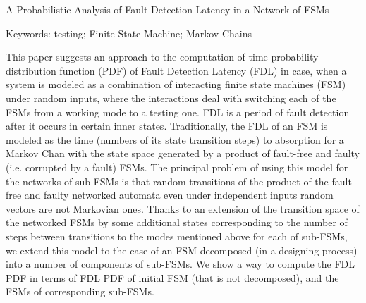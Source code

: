                 A Probabilistic Analysis of Fault Detection Latency in a Network of FSMs

Keywords: testing; Finite State Machine; Markov Chains 

    This paper suggests an approach to the computation of time probability distribution 
function (PDF) of Fault Detection Latency (FDL) in case, when a system is modeled as a 
combination of interacting finite state machines (FSM) under random inputs, where the 
interactions deal with switching each of the FSMs from a working mode to a testing one. FDL is 
a period of fault detection after it occurs in certain inner states. Traditionally, the FDL of an 
FSM is modeled as the time (numbers of its state transition steps) to absorption for a Markov 
Chan with the state space generated by a product of fault-free and faulty (i.e. corrupted by a 
fault) FSMs. The principal problem of using this model for the networks of sub-FSMs is that 
random transitions of the product of the fault-free and faulty networked automata even under 
independent inputs random vectors are not Markovian ones. Thanks to an extension of the 
transition space of the networked FSMs by some additional states corresponding to the number 
of steps between transitions to the modes mentioned above for each of sub-FSMs, we extend this 
model to the case of an FSM decomposed (in a designing process) into a number of components 
of sub-FSMs. We show a way to compute the FDL PDF in terms of FDL PDF of initial FSM 
(that is not decomposed), and the FSMs of corresponding sub-FSMs.   